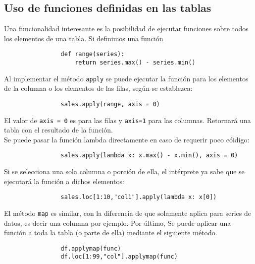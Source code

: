         \subsection{Uso de funciones definidas en las tablas}

            \noindent Una funcionalidad interesante es la posibilidad de ejecutar funciones sobre todos los elementos de una tabla. Si definimos una función
            \begin{verbatim}
                def range(series):
                    return series.max() - series.min()
            \end{verbatim}
            \noindent Al implementar el método \texttt{apply} se puede ejecutar la función para los elementos de la columna o los elementos de las filas, según se establezca:
            \begin{verbatim}
                sales.apply(range, axis = 0)
            \end{verbatim}
            El valor de \texttt{axis = 0} es para las filas y \texttt{axis=1} para las columnas. Retornará una tabla con el resultado de la función. \\
            \noindent Se puede pasar la función lambda directamente en caso de requerir poco cóidigo:
            \begin{verbatim}
                sales.apply(lambda x: x.max() - x.min(), axis = 0)
            \end{verbatim}
            Si se selecciona una sola columna o porción de ella, el intérprete ya sabe que se ejecutará la función a dichos elementos:
            \begin{verbatim}
                sales.loc[1:10,"col1"].apply(lambda x: x[0])
            \end{verbatim}
            \noindent El método \texttt{map} es similar, con la diferencia de que solamente aplica para series de datos, es decir una columna por ejemplo. Por último, Se puede aplicar una función a toda la tabla (o parte de ella) mediante el siguiente método.
            \begin{verbatim}
                df.applymap(func)
                df.loc[1:99,"col"].applymap(func)
            \end{verbatim}

